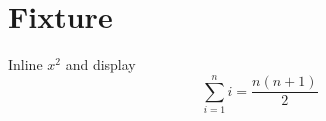 \documentclass{article}
\begin{document}
\section{Fixture}
Inline $x^2$ and display
\[
  \sum_{i=1}^{n} i = \frac{n(n+1)}{2}
\]
\end{document}
